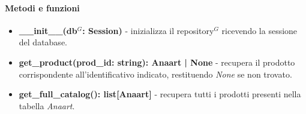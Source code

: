 \paragraph{Metodi e funzioni}
\begin{itemize}
	\item \textbf{\_\_init\_\_(db$^G$: Session)} - inizializza il repository$^G$ ricevendo la
		sessione del database.
	\item \textbf{get\_product(prod\_id: string): Anaart | None} - recupera il prodotto
		corrispondente all'identificativo indicato, restituendo \textit{None} se non
		trovato.
	\item \textbf{get\_full\_catalog(): list[Anaart]} - recupera tutti i prodotti
		presenti nella tabella \textit{Anaart}.
\end{itemize}